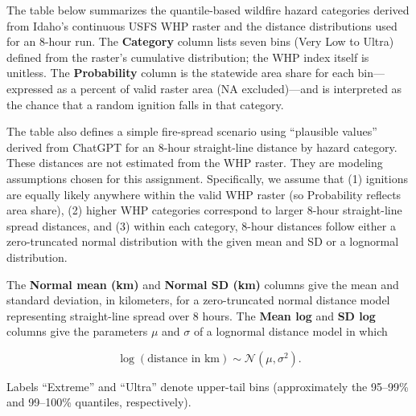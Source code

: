 \documentclass[
  12pt,
]{scrreprt}
\begin{document}
The table below summarizes the quantile-based wildfire hazard categories derived from Idaho's continuous USFS WHP raster and the distance distributions used for an 8-hour run. The \textbf{Category} column lists seven bins (Very Low to Ultra) defined from the raster's cumulative distribution; the WHP index itself is unitless. The \textbf{Probability} column is the statewide area share for each bin---expressed as a percent of valid raster area (NA excluded)---and is interpreted as the chance that a random ignition falls in that category.

The table also defines a simple fire-spread scenario using ``plausible values'' derived from ChatGPT for an 8-hour straight-line distance by hazard category. These distances are not estimated from the WHP raster. They are modeling assumptions chosen for this assignment. Specifically, we assume that (1) ignitions are equally likely anywhere within the valid WHP raster (so Probability reflects area share), (2) higher WHP categories correspond to larger 8-hour straight-line spread distances, and (3) within each category, 8-hour distances follow either a zero-truncated normal distribution with the given mean and SD or a lognormal distribution.

The \textbf{Normal mean (km)} and \textbf{Normal SD (km)} columns give the mean and standard deviation, in kilometers, for a zero-truncated normal distance model representing straight-line spread over 8 hours. The \textbf{Mean log} and \textbf{SD log} columns give the parameters \(\mu\) and \(\sigma\) of a lognormal distance model in which

\[
\log(\text{distance in km}) \sim \mathcal{N}(\mu,\sigma^2).
\]

Labels ``Extreme'' and ``Ultra'' denote upper-tail bins (approximately the 95--99\% and 99--100\% quantiles, respectively).

\begin{table}[!h]
\centering
{}
\end{table}
\end{document}
